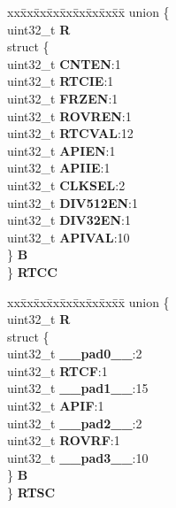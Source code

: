 \begin{DoxyCompactItemize}
\begin{tabbing}
\end{tabbing}\item 
\mbox{\label{structCRP__tag_a67c9d08d0ffb1cad9634a57993f1f724}} 
\begin{tabbing}
xx\=xx\=xx\=xx\=xx\=xx\=xx\=xx\=xx\=\kill
union \{\\
\>uint32\_t {\bfseries R}\\
\>struct \{\\
\>\>uint32\_t {\bfseries CNTEN}:1\\
\>\>uint32\_t {\bfseries RTCIE}:1\\
\>\>uint32\_t {\bfseries FRZEN}:1\\
\>\>uint32\_t {\bfseries ROVREN}:1\\
\>\>uint32\_t {\bfseries RTCVAL}:12\\
\>\>uint32\_t {\bfseries APIEN}:1\\
\>\>uint32\_t {\bfseries APIIE}:1\\
\>\>uint32\_t {\bfseries CLKSEL}:2\\
\>\>uint32\_t {\bfseries DIV512EN}:1\\
\>\>uint32\_t {\bfseries DIV32EN}:1\\
\>\>uint32\_t {\bfseries APIVAL}:10\\
\>\} {\bfseries B}\\
\} {\bfseries RTCC}\\

\end{tabbing}\item 
\mbox{\label{structCRP__tag_a3717d4f5794995af6b1f5f5b4da1beb1}} 
\begin{tabbing}
xx\=xx\=xx\=xx\=xx\=xx\=xx\=xx\=xx\=\kill
union \{\\
\>uint32\_t {\bfseries R}\\
\>struct \{\\
\>\>uint32\_t {\bfseries \_\_pad0\_\_}:2\\
\>\>uint32\_t {\bfseries RTCF}:1\\
\>\>uint32\_t {\bfseries \_\_pad1\_\_}:15\\
\>\>uint32\_t {\bfseries APIF}:1\\
\>\>uint32\_t {\bfseries \_\_pad2\_\_}:2\\
\>\>uint32\_t {\bfseries ROVRF}:1\\
\>\>uint32\_t {\bfseries \_\_pad3\_\_}:10\\
\>\} {\bfseries B}\\
\} {\bfseries RTSC}\\


\end{tabbing}
\end{DoxyCompactItemize}
